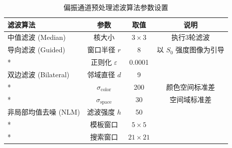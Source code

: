 %

\begin{table}[tbp]
\centering
\caption{偏振通道预处理滤波算法参数设置}
\label{tab:filter_params}
\begin{tabular}{@{}lccc@{}}
\toprule
滤波算法 & 参数 & 取值 & 说明 \\
\midrule
中值滤波 (Median)     & 核大小        & $3\times 3$  & 执行3轮滤波 \\
\addlinespace
导向滤波 (Guided)     & 窗口半径 $r$  & 8            & 以 $S_0$ 强度图像为引导 \\*
                     & 正则化 $\varepsilon$ & 0.0001 & \\
\addlinespace
双边滤波 (Bilateral)  & 邻域直径 $d$  & 9           & \\*
                     & $\sigma_{\text{color}}$ & 200  & 颜色空间标准差 \\*
                     & $\sigma_{\text{space}}$ & 30   & 空间域标准差 \\
\addlinespace
非局部均值去噪 (NLM)  & 滤波强度 $h$  & 50           & \\*
                     & 模板窗口       & $5\times 5$  & \\*
                     & 搜索窗口       & $21\times 21$ & \\
\bottomrule
\end{tabular}
\end{table}
